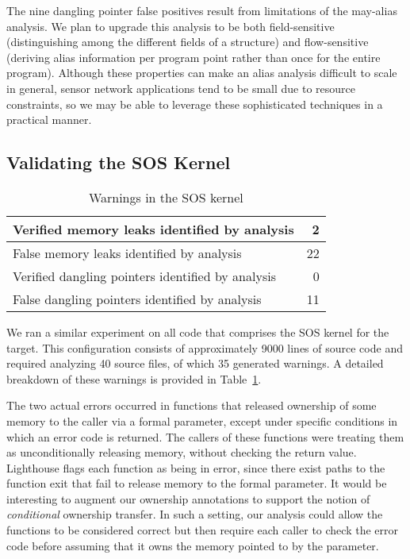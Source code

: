 \smallskip{}

The nine dangling pointer false positives result from limitations of
the may-alias analysis.  
We plan to upgrade this analysis to be both field-sensitive
(distinguishing among the different fields of a structure) and
flow-sensitive (deriving alias information per program point rather
than once for the entire program).  Although these properties can make
an alias analysis difficult to scale in general, sensor network
applications tend to be small due to resource constraints, so we may
be able to leverage these sophisticated techniques in a practical manner.


\subsection{Validating the SOS Kernel}

\begin{table}
\caption{Warnings in the SOS kernel}
%
\label{tab:kernel}
\centering 
\begin{tabular}{| l | r |}
    \hline 
    Verified memory leaks identified by analysis & 2 \\
    \hline
    False memory leaks identified by analysis & 22 \\
    \hline 
    Verified dangling pointers identified by analysis & 0 \\
    \hline 
    False dangling pointers identified by analysis & 11 \\
    \hline 
\end{tabular} 
%
\end{table}


We ran a similar experiment on all code that comprises the 
SOS kernel for the  target.  This configuration consists
of approximately 9000 lines of source code and required analyzing 40
source files, of which 35 generated warnings.    A detailed breakdown of
these warnings is provided in Table~\ref{tab:kernel}.

The two actual errors occurred in
functions that released ownership of some memory to the
caller via a formal parameter,
except 
%
%
under specific conditions in which 
%
an error code is returned.
%
The callers of these functions were treating them as unconditionally
releasing memory, without checking the return value.  Lighthouse flags
each function as being in error, since there exist paths to the
function exit that fail to release memory to the formal parameter.  
It would be
interesting to augment our ownership annotations to support the notion
of {\em conditional} ownership transfer.  In such a setting, our
analysis could allow the functions to be considered correct but then
require each caller to check the error code before assuming that it owns
the memory pointed to by the parameter.


